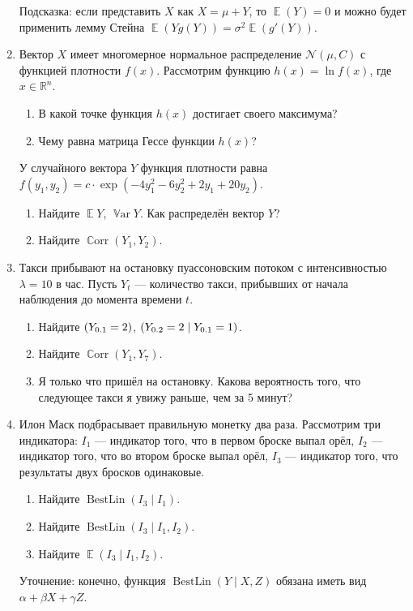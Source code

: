 \documentclass[12pt]{article}
\DeclareMathOperator{\BestLin}{BestLin}
\DeclareMathOperator{\Corr}{\mathbb{C}orr}
\DeclareMathOperator{\Var}{\mathbb{V}ar}
\let\P\relax
\DeclareMathOperator{\P}{\mathbb{P}}
\DeclareMathOperator{\E}{\mathbb{E}}
\newcommand \cN{\mathcal{N}}
\newcommand \RR{\mathbb{R}}
\begin{document}
\begin{enumerate}
Подсказка: если представить $X$ как $X = \mu + Y$, то $\E(Y) = 0$ и можно будет применить лемму Стейна $\E(Y g(Y)) = \sigma^2 \E(g'(Y))$.

\item %
Вектор $X$ имеет многомерное нормальное распределение $\cN(\mu, C)$ с функцией плотности $f(x)$.
Рассмотрим функцию $h(x) = \ln f(x)$, где $x\in \RR^n$.
\begin{enumerate}
    \item В какой точке функция $h(x)$ достигает своего максимума?
    \item Чему равна матрица Гессе функции $h(x)$?
\end{enumerate}
У случайного вектора $Y$ функция плотности равна $f(y_1, y_2) = c \cdot \exp(-4y_1^2 - 6y_2^2 + 2y_1 + 20y_2)$.
\begin{enumerate}
    \item Найдите $\E Y$, $\Var Y$. Как распределён вектор $Y$?
    \item Найдите $\Corr(Y_1, Y_2)$.
\end{enumerate}

\item %
Такси прибывают на остановку пуассоновским потоком с интенсивностью $\lambda = 10$ в час. 
Пусть $Y_t$ — количество такси, прибывших от начала наблюдения до момента времени $t$.
\begin{enumerate}
    \item Найдите $\P(Y_{0.1} = 2)$, $\P(Y_{0.2} = 2 \mid Y_{0.1} = 1)$.
    \item Найдите $\Corr(Y_1, Y_7)$.
    \item Я только что пришёл на остановку. Какова вероятность того, что следующее такси я увижу раньше, чем за 5 минут?
\end{enumerate}

\item %
Илон Маск подбрасывает правильную монетку два раза. 
Рассмотрим три индикатора: $I_1$ — индикатор того, что в первом броске выпал орёл,
$I_2$ — индикатор того, что во втором броске выпал орёл, 
$I_3$ — индикатор того, что результаты двух бросков одинаковые.
\begin{enumerate}
    \item Найдите $\BestLin(I_3 \mid I_1)$.
    \item Найдите $\BestLin(I_3 \mid I_1, I_2)$.
    \item Найдите $\E(I_3 \mid I_1, I_2)$.
\end{enumerate}

Уточнение: конечно, функция $\BestLin(Y \mid X, Z)$ обязана иметь вид $\alpha + \beta X + \gamma Z$.

\end{enumerate}
\end{document}
